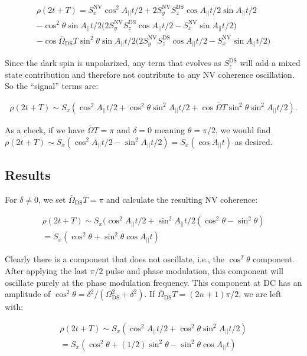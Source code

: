 \documentclass[%
 reprint,
 amsmath,amssymb,
 aps,
]{revtex4-1}
\begin{document}
\begin{align}
    \rho(2t + T) = S_{x}^{\text{NV}} \cos^2{A_{||}t/2} + 2 S_{y}^{\text{NV}} S_{z}^{\text{DS}} \cos{A_{||}t/2} \sin{A_{||}t/2}
    \\- \cos^2{\theta}\sin{A_{||}t/2}\Big(2S_{y}^{\text{NV}}S_{z}^{\text{DS}}\cos{A_{||}t/2} - S_{x}^{\text{NV}} \sin{A_{||}t/2}\Big)
    \\- \cos{\bar\Omega_{\text{DS}} T} \sin^2{\theta} \sin{A_{||}t/2} \Big(2 S_{y}^{\text{NV}} S_{z}^{\text{DS}} \cos{A_{||}t/2} - S_{x}^{\text{NV}} \sin{A_{||}t/2}\Big)
\end{align}

Since the dark spin is unpolarized, any term that evolves as $S_{z}^{\text{DS}}$ will add a mixed state contribution and therefore not contribute to any NV coherence oscillation. So the ``signal'' terms are:

\begin{align}
    \rho(2t + T) \sim S_{x} (\cos^2{A_{||}t/2} + \cos^2{\theta}\sin^2{A_{||}t/2} + \cos{\bar\Omega T} \sin^2{\theta} \sin^2{A_{||}t/2}).
\end{align}

As a check, if we have $\bar \Omega T = \pi$ and $\delta = 0$ meaning $\theta = \pi/2$, we would find $\rho(2t + T) \sim S_{x}(\cos^2{A_{||}t/2} - \sin^2{A_{||}t/2}) = S_{x}(\cos{A_{||}t})$ as desired. 
\subsection{Results}

For $\delta \neq 0$, we set $\bar \Omega_{\text{DS}} T = \pi$ and calculate the resulting NV coherence: 

\begin{align}
    \rho(2t + T) \sim S_{x} (\cos^2{A_{||}t/2} + \sin^2{A_{||}t/2}(\cos^2{\theta} - \sin^2{\theta})
    \\ = S_{x}(\cos^2{\theta} + \sin^2{\theta}\cos{A_{||}t})
\end{align}

Clearly there is a component that does not oscillate, i.e., the $\cos^2{\theta}$ component. After applying the last $\pi/2$ pulse and phase modulation, this component will oscillate purely at the phase modulation frequency. This component at DC has an amplitude of $\cos^2{\theta} = \delta^2/(\Omega_{\text{DS}}^2 + \delta^2)$. If $\bar\Omega_{\text{DS}} T = (2n+1)\pi/2$, we are left with: 

\begin{align}
\rho(2t + T) \sim S_{x}(\cos^2{A_{||}t/2} + \cos^2{\theta}\sin^2{A_{||}t/2})
\\ = S_{x}(\cos^2{\theta}+(1/2)\sin^2{\theta} - \sin^2{\theta}\cos{A_{||}t})
\end{align}
\end{document}
